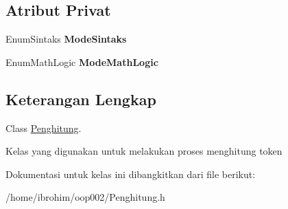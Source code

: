 \subsection*{Atribut Privat}
\begin{DoxyCompactItemize}
\item 
\hypertarget{classPenghitung_ae43b518225f5e7214ba8a06f8a13fb0d}{}Enum\+Sintaks {\bfseries Mode\+Sintaks}\label{classPenghitung_ae43b518225f5e7214ba8a06f8a13fb0d}

\item 
\hypertarget{classPenghitung_ada6a61b4abe04793864ef38a9b496736}{}Enum\+Math\+Logic {\bfseries Mode\+Math\+Logic}\label{classPenghitung_ada6a61b4abe04793864ef38a9b496736}

\end{DoxyCompactItemize}


\subsection{Keterangan Lengkap}
Class \hyperlink{classPenghitung}{Penghitung}. 

Kelas yang digunakan untuk melakukan proses menghitung token 

Dokumentasi untuk kelas ini dibangkitkan dari file berikut\+:\begin{DoxyCompactItemize}
\item 
/home/ibrohim/oop002/Penghitung.\+h\end{DoxyCompactItemize}
